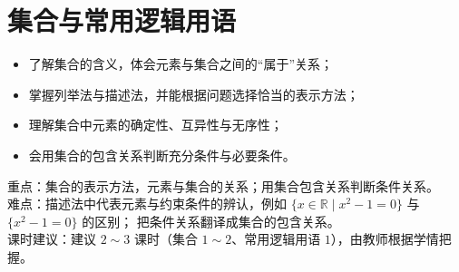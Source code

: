 \chapter{集合与常用逻辑用语}

\begin{objective}
\begin{itemize}
  \item 了解集合的含义，体会元素与集合之间的“属于”关系；
  \item 掌握列举法与描述法，并能根据问题选择恰当的表示方法；
  \item 理解集合中元素的确定性、互异性与无序性；
  \item 会用集合的包含关系判断充分条件与必要条件。
\end{itemize}
\end{objective}

\begin{keypoint}
重点：集合的表示方法，元素与集合的关系；用集合包含关系判断条件关系。\\
难点：描述法中代表元素与约束条件的辨认，例如 $\{x\in\mathbb{R}\mid x^2-1=0\}$ 与 $\{x^2-1=0\}$ 的区别；
把条件关系翻译成集合的包含关系。\\
课时建议：建议 $2\sim3$ 课时（集合 $1\sim2$、常用逻辑用语 $1$），由教师根据学情把握。
\end{keypoint}

